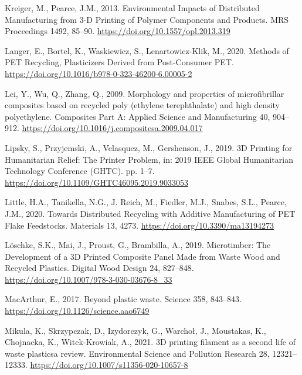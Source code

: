 \documentclass[
  12pt,
]{article}
\newlength{\cslhangindent}
\newlength{\cslentryspacingunit} %
\newenvironment{CSLReferences}[2] %
 {%
  \setlength{\parindent}{0pt}
  \ifodd #1
  \let\oldpar\par
  \def\par{\hangindent=\cslhangindent\oldpar}
  \fi
  \setlength{\parskip}{#2\cslentryspacingunit}
 }%
 {}
\begin{document}
\begin{CSLReferences}{1}{0}
\leavevmode{}%
Kreiger, M., Pearce, J.M., 2013. Environmental {Impacts} of {Distributed
Manufacturing} from 3-{D Printing} of {Polymer Components} and
{Products}. MRS Proceedings 1492, 85--90.
\url{https://doi.org/10.1557/opl.2013.319}

\leavevmode{}%
Langer, E., Bortel, K., Waskiewicz, S., Lenartowicz-Klik, M., 2020.
Methods of {PET Recycling}, Plasticizers Derived from Post-Consumer PET.
\url{https://doi.org/10.1016/b978-0-323-46200-6.00005-2}

\leavevmode{}%
Lei, Y., Wu, Q., Zhang, Q., 2009. Morphology and properties of
microfibrillar composites based on recycled poly (ethylene
terephthalate) and high density polyethylene. Composites Part A: Applied
Science and Manufacturing 40, 904--912.
\url{https://doi.org/10.1016/j.compositesa.2009.04.017}

\leavevmode{}%
Lipsky, S., Przyjemski, A., Velasquez, M., Gershenson, J., 2019. {3D
Printing} for {Humanitarian Relief}: {The Printer Problem}, in: 2019
{IEEE Global Humanitarian Technology Conference} ({GHTC}). pp. 1--7.
\url{https://doi.org/10.1109/GHTC46095.2019.9033053}

\leavevmode{}%
Little, H.A., Tanikella, N.G., J. Reich, M., Fiedler, M.J., Snabes,
S.L., Pearce, J.M., 2020. Towards {Distributed Recycling} with {Additive
Manufacturing} of {PET Flake Feedstocks}. Materials 13, 4273.
\url{https://doi.org/10.3390/ma13194273}

\leavevmode{}%
Löschke, S.K., Mai, J., Proust, G., Brambilla, A., 2019. Microtimber:
{The Development} of a {3D Printed Composite Panel Made} from {Waste
Wood} and {Recycled Plastics}. Digital Wood Design 24, 827--848.
\url{https://doi.org/10.1007/978-3-030-03676-8_33}

\leavevmode{}%
MacArthur, E., 2017. Beyond plastic waste. Science 358, 843--843.
\url{https://doi.org/10.1126/science.aao6749}

\leavevmode{}%
Mikula, K., Skrzypczak, D., Izydorczyk, G., Warchoł, J., Moustakas, K.,
Chojnacka, K., Witek-Krowiak, A., 2021. {3D} printing filament as a
second life of waste plastics\textemdash a review. Environmental Science
and Pollution Research 28, 12321--12333.
\url{https://doi.org/10.1007/s11356-020-10657-8}


\end{CSLReferences}
\end{document}
